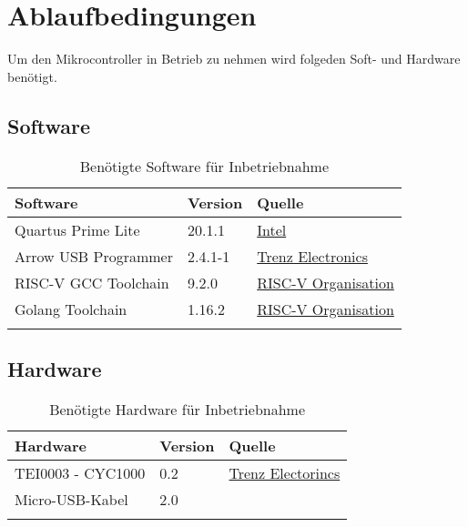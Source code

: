 \chapter{Ablaufbedingungen}
    Um den Mikrocontroller in Betrieb zu nehmen wird folgeden Soft- und Hardware benötigt.

    \section{Software}
        \begin{center}
            \begin{longtable}{| l | l | l |}
                \hline
                    Software & Version & Quelle \\
                \hline
                    Quartus Prime Lite & 20.1.1 & \href{https://fpgasoftware.intel.com/?edition=lite}{Intel}\\
                \hline
                    Arrow USB Programmer & 2.4.1-1 & \href{https://wiki.trenz-electronic.de/display/PD/Arrow+USB+Programmer#ArrowUSBProgrammer-DownloadSetupFiles}{Trenz Electronics}\\
                \hline
                    RISC-V GCC Toolchain & 9.2.0 & \href{https://github.com/riscv/riscv-gnu-toolchain}{RISC-V Organisation}\\
                \hline
                    Golang Toolchain & 1.16.2 & \href{https://golang.org/}{RISC-V Organisation}\\
                \hline
                \caption{Benötigte Software für Inbetriebnahme}
            \end{longtable}
        \end{center}

    \section{Hardware}
        \begin{center}
            \begin{longtable}{| l | l | l |}
                \hline
                    Hardware & Version & Quelle \\
                \hline
                    TEI0003 - CYC1000 & 0.2 & \href{https://wiki.trenz-electronic.de/display/PD/TEI0003+Getting+Started}{Trenz Electorincs}\\
                \hline
                    Micro-USB-Kabel & 2.0 & \\
                \hline
                \caption{Benötigte Hardware für Inbetriebnahme}
            \end{longtable}
        \end{center}